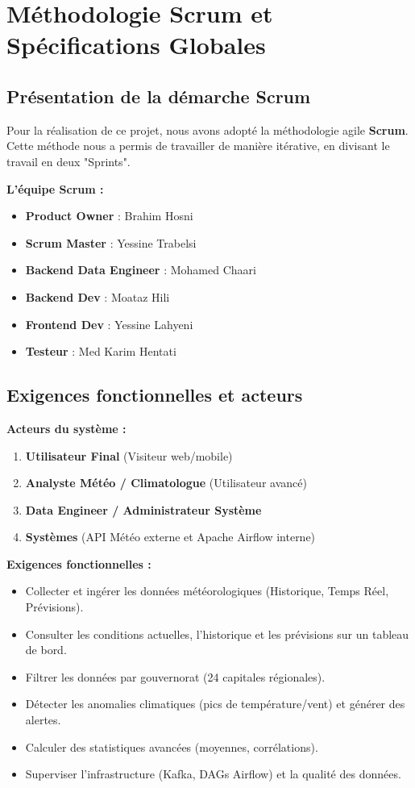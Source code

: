 \chapter{Méthodologie Scrum et Spécifications Globales}

\section{Présentation de la démarche Scrum}
Pour la réalisation de ce projet, nous avons adopté la méthodologie agile \textbf{Scrum}. Cette méthode nous a permis de travailler de manière itérative, en divisant le travail en deux "Sprints".

\textbf{L'équipe Scrum :}
\begin{itemize}
  \item \textbf{Product Owner} : Brahim Hosni
  \item \textbf{Scrum Master} : Yessine Trabelsi
  \item \textbf{Backend Data Engineer} : Mohamed Chaari
  \item \textbf{Backend Dev} : Moataz Hili
  \item \textbf{Frontend Dev} : Yessine Lahyeni
  \item \textbf{Testeur} : Med Karim Hentati
\end{itemize}

\section{Exigences fonctionnelles et acteurs}

\textbf{Acteurs du système :}
\begin{enumerate}
    \item \textbf{Utilisateur Final} (Visiteur web/mobile)
    \item \textbf{Analyste Météo / Climatologue} (Utilisateur avancé)
    \item \textbf{Data Engineer / Administrateur Système}
    \item \textbf{Systèmes} (API Météo externe et Apache Airflow interne)
\end{enumerate}

\textbf{Exigences fonctionnelles :}
\begin{itemize}
    \item Collecter et ingérer les données météorologiques (Historique, Temps Réel, Prévisions).
    \item Consulter les conditions actuelles, l'historique et les prévisions sur un tableau de bord.
    \item Filtrer les données par gouvernorat (24 capitales régionales).
    \item Détecter les anomalies climatiques (pics de température/vent) et générer des alertes.
    \item Calculer des statistiques avancées (moyennes, corrélations).
    \item Superviser l'infrastructure (Kafka, DAGs Airflow) et la qualité des données.
\end{itemize}

